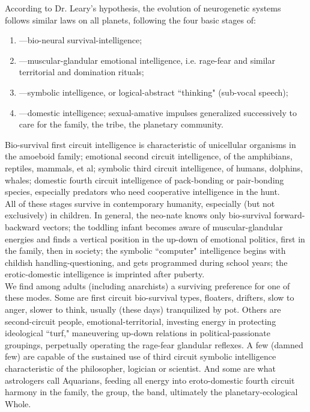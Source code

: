 According to Dr. Leary's hypothesis, the evolution of neurogenetic systems follows similar laws on all planets, following the four basic stages of:
\begin{enumerate}
\item ---bio-neural survival-intelligence;
\item ---muscular-glandular emotional intelligence, i.e. rage-fear and similar territorial and domination rituals;
\item ---symbolic intelligence, or logical-abstract ``thinking" (sub-vocal speech);
\item ---domestic intelligence; sexual-amative impulses generalized successively to care for the family, the tribe, the planetary community.
\end{enumerate}
Bio-survival first circuit intelligence is characteristic of unicellular organisms in the amoeboid family; emotional second circuit intelligence, of the amphibians, reptiles, mammals, et al; symbolic third circuit intelligence, of humans, dolphins, whales; domestic fourth circuit intelligence of pack-bonding or pair-bonding species, especially predators who need cooperative intelligence in the hunt.\\
All of these stages survive in contemporary humanity, especially (but not exclusively) in children. In general, the neo-nate knows only bio-survival forward-backward vectors; the toddling infant becomes aware of muscular-glandular energies and finds a vertical position in the up-down of emotional politics, first in the family, then in society; the symbolic ``computer" intelligence begins with childish handling-questioning, and gets programmed during school years; the erotic-domestic intelligence is imprinted after puberty.\\
We find among adults (including anarchists) a surviving preference for one of these modes. Some are first circuit bio-survival types, floaters, drifters, slow to anger, slower to think, usually (these days) tranquilized by pot. Others are second-circuit people, emotional-territorial, investing energy in protecting ideological ``turf," maneuvering up-down relations in political-passionate groupings, perpetually operating the rage-fear glandular reflexes. A few (damned few) are capable of the sustained use of third circuit symbolic intelligence characteristic of the philosopher, logician or scientist. And some are what astrologers call Aquarians, feeding all energy into eroto-domestic fourth circuit harmony in the family, the group, the band, ultimately the planetary-ecological Whole.\\
